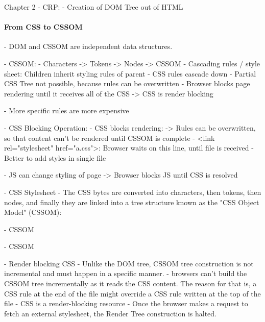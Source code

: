 Chapter 2
- CRP:
- Creation of DOM Tree out of HTML




\paragraph{From CSS to CSSOM}



- DOM and CSSOM are independent data structures.

- CSSOM:
	- Characters -> Tokens -> Nodes -> CSSOM
	- Cascading rules / style sheet: Children inherit styling rules of parent
	- CSS rules cascade down
	- Partial CSS Tree not possible, because rules can be overwritten
	- Browser blocks page rendering until it receives all of the CSS
	-> CSS is render blocking

	- More specific rules are more expensive
	
	
- CSS Blocking Operation:
	- CSS blocks rendering:
	-> Rules can be overwritten, so that content can't be rendered until CSSOM is complete
	- <link rel="stylesheet" href="a.css">: Browser waits on this line, until file is received
	- Better to add styles in single file

	- JS can change styling of page -> Browser blocks JS until CSS is resolved
	
	



- CSS Stylesheet
- The CSS bytes are converted into characters, then tokens, then nodes, and finally they are linked into a tree structure known as the "CSS Object Model" (CSSOM):


- CSSOM

- CSSOM



- Render blocking CSS
- Unlike the DOM tree, CSSOM tree construction is not incremental and must happen in a specific manner.
- browsers can’t build the CSSOM tree incrementally as it reads the CSS content. The reason for that is, a CSS rule at the end of the file might override a CSS rule written at the top of the file
- CSS is a render-blocking resource
- Once the browser makes a request to fetch an external stylesheet, the Render Tree construction is halted.





